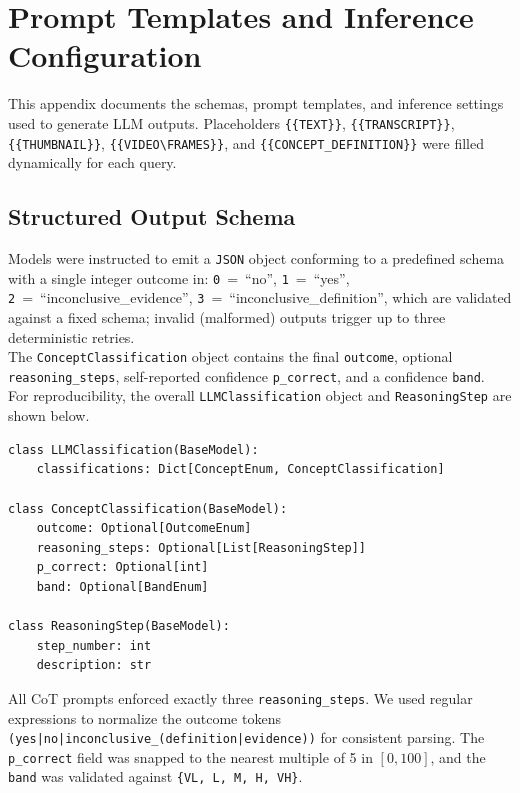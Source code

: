 \section{Prompt Templates and Inference Configuration}
\label{app:prompts}

This appendix documents the schemas, prompt templates, and inference settings used to generate LLM outputs. Placeholders \verb+{{TEXT}}+, \verb+{{TRANSCRIPT}}+, \verb+{{THUMBNAIL}}+, \verb+{{VIDEO\FRAMES}}+, and \verb+{{CONCEPT_DEFINITION}}+ were filled dynamically for each query.

\subsection{Structured Output Schema}
\label{app:schema}

Models were instructed to emit a \texttt{JSON} object conforming to a predefined schema with a single integer outcome in: \texttt{0}~=~``no'', \texttt{1}~=~``yes'', \texttt{2}~=~``inconclusive\_evidence'', \texttt{3}~=~``inconclusive\_definition'', which are validated against a fixed schema; invalid (malformed) outputs trigger up to three deterministic retries.\\
The \texttt{ConceptClassification} object contains the final \texttt{outcome}, optional \verb+reasoning_steps+, self-reported confidence \verb+p_correct+, and a confidence \texttt{band}. \\
For reproducibility, the overall \verb+LLMClassification+ object and \verb+ReasoningStep+ are shown below.

\begingroup\small
\begin{verbatim}
class LLMClassification(BaseModel):
    classifications: Dict[ConceptEnum, ConceptClassification]

class ConceptClassification(BaseModel):
    outcome: Optional[OutcomeEnum]
    reasoning_steps: Optional[List[ReasoningStep]]
    p_correct: Optional[int]
    band: Optional[BandEnum]

class ReasoningStep(BaseModel):
    step_number: int
    description: str
\end{verbatim}
\endgroup

All CoT prompts enforced exactly three \verb+reasoning_steps+. We used regular expressions to normalize the outcome tokens\\
\texttt{(yes|no|inconclusive\_(definition|evidence))} for consistent parsing. The \verb+p_correct+ field was snapped to the nearest multiple of 5 in \([0,100]\), and the \texttt{band} was validated against \verb+{VL, L, M, H, VH}+.

